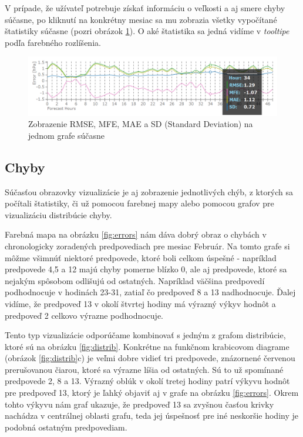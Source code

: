 V prípade, že užívateľ potrebuje získať informáciu o veľkosti a aj smere chyby súčasne, po kliknutí na konkrétny mesiac sa mu zobrazia všetky vypočítané štatistiky súčasne (pozri obrázok \ref{fig:detail}). O aké štatistika sa jedná vidíme v \textit{tooltipe} podľa farebného rozlíšenia.

\begin{figure}
	\centering
	\includegraphics[width = 6in]{detail}
	\caption{Zobrazenie RMSE, MFE, MAE a SD (Standard Deviation) na jednom grafe súčasne}
	\label{fig:detail} 
\end{figure}


\subsection{Chyby}

Súčasťou obrazovky vizualizácie je aj zobrazenie jednotlivých chýb, z ktorých sa počítali štatistiky, či už pomocou farebnej mapy alebo pomocou grafov pre vizualizáciu distribúcie chyby.

Farebná mapa na obrázku \ref{fig:errors} nám dáva dobrý obraz o chybách v chronologicky zoradených predpovediach pre mesiac Február. Na tomto grafe si môžme všimnúť niektoré predpovede, ktoré boli celkom úspešné - napríklad predpovede 4,5 a 12 majú chyby pomerne blízko 0, ale aj predpovede, ktoré sa nejakým spôsobom odlišujú od ostatných. Napríklad väčšina predpovedí podhodnocuje v hodinách 23-31, zatiaľ čo predpoveď 8 a 13 nadhodnocuje. Ďalej vidíme, že predpoveď 13 v okolí štvrtej hodiny má výrazný výkyv hodnôt a predpoveď 2 celkovo výrazne podhodnocuje.

Tento typ vizualizácie odporúčame kombinovať s jedným z grafom distribúcie, ktoré sú na obrázku \ref{fig:distrib}. Konkrétne na funkčnom krabicovom diagrame (obrázok \ref{fig:distrib}c) je veľmi dobre vidieť tri predpovede, znázornené červenou prerušovanou čiarou, ktoré sa výrazne líšia od ostatných. Sú to už spomínané predpovede 2, 8 a 13. Výrazný oblúk v okolí tretej hodiny patrí výkyvu hodnôt pre predpoveď 13, ktorý je ľahký objaviť aj v grafe na obrázku \ref{fig:errors}. Okrem tohto výkyvu nám graf ukazuje, že predpoveď 13 sa zvyšnou časťou krivky nachádza v centrálnej oblasti grafu, teda jej úspešnosť pre iné neskoršie hodiny je podobná ostatným predpovediam.

